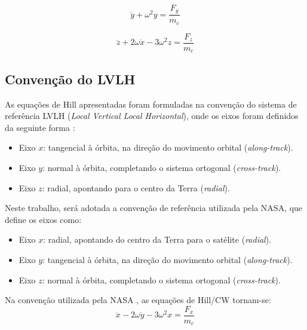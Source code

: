 \begin{equation}
    \label{eq:equacoes_HillY}
\ddot{y} + \omega^2 y = \frac{F_y}{m_c}
\end{equation}

\begin{equation}
    \label{eq:equacoes_HillZ}
\ddot{z} + 2\omega \dot{x} - 3 \omega^2 z = \frac{F_z}{m_c}
\end{equation}


\subsection{Convenção do LVLH}

As equações de Hill apresentadas foram formuladas na convenção do sistema de referência LVLH (\emph{Local Vertical Local Horizontal}), onde os eixos foram definidos da seguinte forma \cite{fehse2003}:
\begin{itemize}
    \item Eixo $x$: tangencial à órbita, na direção do movimento orbital (\emph{along-track}).
    \item Eixo $y$: normal à órbita, completando o sistema ortogonal  (\emph{cross-track}).
    \item Eixo $z$: radial, apontando para o centro da Terra  (\emph{radial}).
\end{itemize}

Neste trabalho, será adotada a convenção de referência utilizada pela NASA, que define os eixos como:

\begin{itemize}
    \item Eixo $x$: radial, apontando do centro da Terra para o satélite (\emph{radial}).
    \item Eixo $y$: tangencial à órbita, na direção do movimento orbital  (\emph{along-track}).
    \item Eixo $z$: normal à órbita, completando o sistema ortogonal  (\emph{cross-track}).
\end{itemize}

Na convenção utilizada pela NASA \cite{Folta2022}, as equações de Hill/CW tornam-se:
\begin{equation}
    \label{eq:Hill_NASA_X}
    \ddot{x} - 2\omega \dot{y} - 3\omega^2 x = \frac{F_x}{m_c}
\end{equation}

